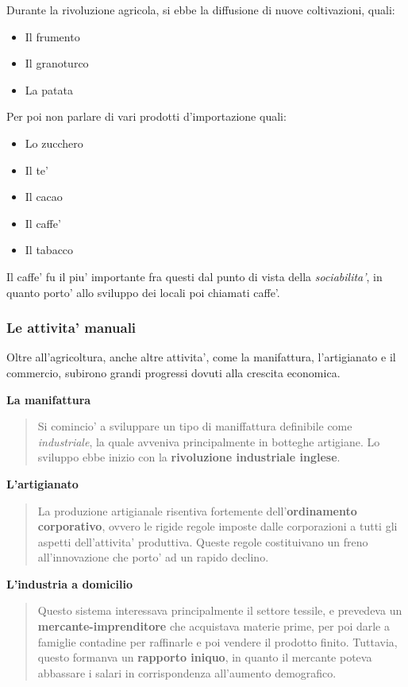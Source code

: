 \documentclass{article}
\begin{document}
{{    Durante la rivoluzione agricola, si ebbe la diffusione di nuove coltivazioni, quali:

    \begin{itemize}
      \item Il frumento
      \item Il granoturco
      \item La patata
    \end{itemize}

    Per poi non parlare di vari prodotti d'importazione quali:

    \begin{itemize}
      \item Lo zucchero
      \item Il te'
      \item Il cacao
      \item Il caffe'
      \item Il tabacco
    \end{itemize}

    Il caffe' fu il piu' importante fra questi dal punto di vista della \textit{sociabilita'}, in quanto porto' allo sviluppo dei locali poi chiamati caffe'.

    \subsubsection{Le attivita' manuali}
    Oltre all'agricoltura, anche altre attivita', come la manifattura, l'artigianato e il commercio, subirono grandi progressi dovuti alla crescita economica.

    \textbf{La manifattura}
    \begin{quote}
      Si comincio' a sviluppare un tipo di maniffattura definibile come \textit{industriale}, la quale avveniva principalmente in botteghe artigiane. Lo sviluppo ebbe inizio con la \textbf{rivoluzione industriale inglese}.
    \end{quote}

    \textbf{L'artigianato}
    \begin{quote}
      La produzione artigianale risentiva fortemente dell'\textbf{ordinamento corporativo}, ovvero le rigide regole imposte dalle corporazioni a tutti gli aspetti dell'attivita' produttiva. Queste regole costituivano un freno all'innovazione che porto' ad un rapido declino.
    \end{quote}

    \textbf{L'industria a domicilio}
    \begin{quote}
      Questo sistema interessava principalmente il settore tessile, e prevedeva un \textbf{mercante-imprenditore} che acquistava materie prime, per poi darle a famiglie contadine per raffinarle e poi vendere il prodotto finito. Tuttavia, questo formanva un \textbf{rapporto iniquo}, in quanto il mercante poteva abbassare i salari in corrispondenza all'aumento demografico.
    \end{quote}

}}
\end{document}
